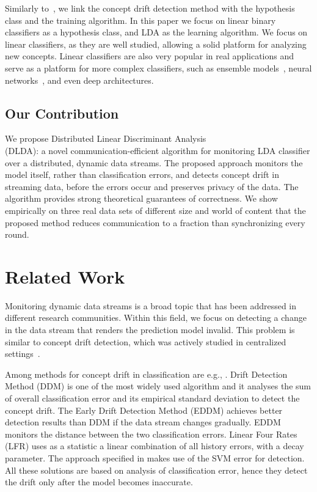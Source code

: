 \documentclass{sig-alternate-05-2015}
\begin{document}
Similarly to~\cite{icml2014c2_harel14}, we link the concept drift detection method with the
hypothesis class and the training algorithm.
In this paper we focus on linear binary classifiers as a hypothesis class, and
LDA \cite{fisher1936use} as the learning algorithm.
We focus on linear classifiers, as they are well studied, allowing a solid platform for analyzing new concepts. Linear classifiers are also very popular in real applications and serve as a platform for more complex classifiers, such as ensemble models~\cite{Deva, eSVM},
neural networks~\cite{osadchy2015k}, and even deep architectures\cite{ROSS}.


\subsection{Our Contribution}
We propose Distributed Linear Discriminant Analysis
\\ (DLDA): a novel communication-efficient algorithm for monitoring LDA classifier over a distributed, dynamic data streams.
The proposed approach monitors the model itself, rather than classification errors,
and detects concept drift in streaming data, before the errors occur and preserves privacy of the data.
The algorithm provides strong theoretical guarantees of correctness.
We show empirically on three real data sets of different size and world of content that the proposed
method reduces communication to a fraction than synchronizing every round.


\section{Related Work}
Monitoring dynamic data streams is a broad topic that has been addressed in different research communities. Within this field, we focus on detecting a change in the data stream that renders the prediction model invalid. This problem is similar to concept drift detection, which was actively studied in centralized settings~\cite{basseville1993detection,brodsky2013nonparametric,ChenGupta2000,Tsymbal,Gama2014}.

Among methods for concept drift in classification are e.g., \cite{gama2004learning,baena2006early,klinkenberg2000detecting,dries2009adaptive,icml2014c2_harel14,AngGZPH13}. Drift Detection Method (DDM) \cite{gama2004learning} is one of the most widely used algorithm and it analyses the sum of overall classification error and its empirical standard deviation to detect the concept drift.
The Early Drift Detection Method (EDDM) \cite{baena2006early} achieves better detection results than DDM if the data stream changes gradually. EDDM monitors the distance between the two classification errors.
Linear Four Rates (LFR) \cite{wang2015concept} uses as a statistic a linear combination of all history errors, with a decay parameter. The approach specified in \cite{klinkenberg2000detecting,dries2009adaptive} makes use of
the SVM error for detection. All these solutions are based on analysis of classification error, hence they detect the drift only after the model becomes inaccurate.
\end{document}
